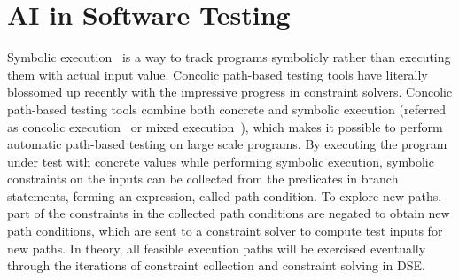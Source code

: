 \section{AI in Software Testing}
% 
Symbolic execution~\cite{symbolic} is a way to track programs symbolicly rather than executing them with actual input value. Concolic path-based testing tools have literally blossomed up recently \cite{extenjpf,structural,mixed,exe,fuzz,pex} with the impressive progress in constraint solvers. Concolic path-based testing tools combine both concrete and symbolic execution (referred as concolic execution~\cite{dart,cute} or mixed execution~\cite{mixed}), which makes it possible to perform automatic path-based testing on large scale programs. By executing the program under test with concrete values while performing symbolic execution, symbolic constraints on the inputs can be collected from the predicates in branch statements, forming an expression, called path condition. To explore new paths, part of the constraints in the collected path conditions are negated to obtain new path conditions, which are sent to a constraint solver to compute test inputs for new paths. In theory, all feasible execution paths will be exercised eventually through the iterations of constraint collection and constraint solving in DSE.
% 

